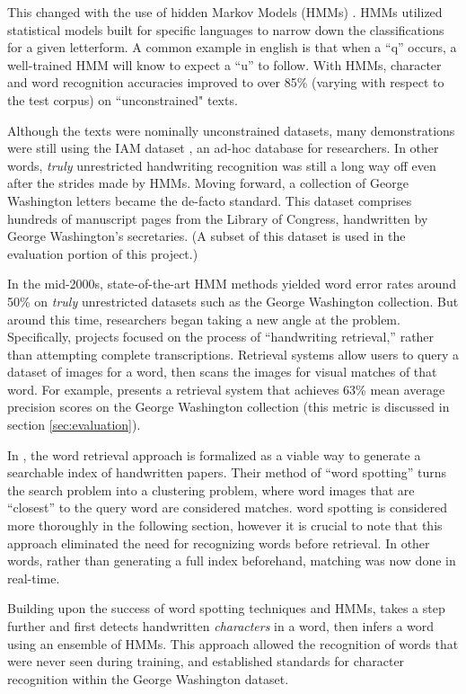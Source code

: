 \documentclass[final]{ukthesis}
\begin{document}
This changed with the use of hidden Markov Models (HMMs) \cite{marti2001using,bunke2004offline,el1999hmm}. HMMs utilized statistical models built for specific languages to narrow down the classifications for a given letterform. A common example in english is that when a ``q'' occurs, a well-trained HMM will know to expect a ``u'' to follow. With HMMs, character and word recognition accuracies improved to over 85\% (varying with respect to the test corpus) on ``unconstrained" texts.

Although the texts were nominally unconstrained datasets, many demonstrations were still using the IAM dataset \cite{marti2002iam}, an ad-hoc database for researchers. In other words, {\em truly} unrestricted handwriting recognition was still a long way off even after the strides made by HMMs. Moving forward, a collection of George Washington letters became the de-facto standard. This dataset comprises hundreds of manuscript pages from the Library of Congress, handwritten by George Washington's secretaries. (A subset of this dataset is used in the evaluation portion of this project.)

In the mid-2000s, state-of-the-art HMM methods yielded word error rates around 50\% on {\em truly} unrestricted datasets such as the George Washington collection. But around this time, researchers began taking a new angle at the problem. Specifically, projects focused on the process of ``handwriting retrieval,'' rather than attempting complete transcriptions. Retrieval systems allow users to query a dataset of images for a word, then scans the images for visual matches of that word. For example, \cite{rath2004search} presents a retrieval system that achieves 63\% mean average precision scores on the George Washington collection (this metric is discussed in section \ref{sec:evaluation}).

In \cite{rath2007word}, the word retrieval approach is formalized as a viable way to generate a searchable index of handwritten papers. Their method of ``word spotting'' turns the search problem into a clustering problem, where word images that are ``closest'' to the query word are considered matches. word spotting is considered more thoroughly in the following section, however it is crucial to note that this approach eliminated the need for recognizing words before retrieval. In other words, rather than generating a full index beforehand, matching was now done in real-time.

Building upon the success of word spotting techniques and HMMs, \cite{howe2009finding} takes a step further and first detects handwritten {\em characters} in a word, then infers a word using an ensemble of HMMs. This approach allowed the recognition of words that were never seen during training, and established standards for character recognition within the George Washington dataset.
\end{document}
